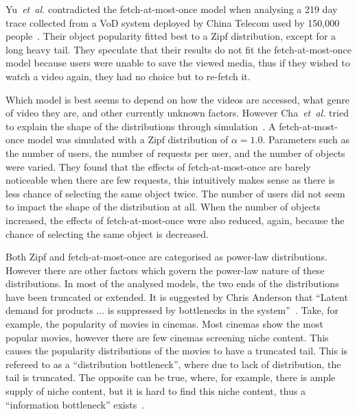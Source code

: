 
    Yu~\emph{et~al.} contradicted the fetch-at-most-once model when analysing a 219 day trace collected from a VoD system deployed by China Telecom used by 150,000 people~\cite{yu2006uub}. Their object popularity fitted best to a Zipf distribution, except for a long heavy tail. They speculate that their results do not fit the fetch-at-most-once model because users were unable to save the viewed media, thus if they wished to watch a video again, they had no choice but to re-fetch it.

    Which model is best seems to depend on how the videos are accessed, what genre of video they are, and other currently unknown factors. However Cha~\emph{et~al.} tried to explain the shape of the distributions through simulation~\cite{cha2007tyt}. A fetch-at-most-once model was simulated with a Zipf distribution of $\alpha=1.0$. Parameters such as the number of users, the number of requests per user, and the number of objects were varied. They found that the effects of fetch-at-most-once are barely noticeable when there are few requests, this intuitively makes sense as there is less chance of selecting the same object twice. The number of users did not seem to impact the shape of the distribution at all. When the number of objects increased, the effects of fetch-at-most-once were also reduced, again, because the chance of selecting the same object is decreased.

    Both Zipf and fetch-at-most-once are categorised as power-law distributions. However there are other factors which govern the power-law nature of these distributions. In most of the analysed models, the two ends of the distributions have been truncated or extended. It is suggested by Chris Anderson that ``Latent demand for products ... is suppressed by bottlenecks in the system''~\cite{anderson2006tlt}. Take, for example, the popularity of movies in cinemas. Most cinemas show the most popular movies, however there are few cinemas screening niche content. This causes the popularity distributions of the movies to have a truncated tail. This is refereed to as a ``distribution bottleneck'', where due to lack of distribution, the tail is truncated. The opposite can be true, where, for example, there is ample supply of niche content, but it is hard to find this niche content, thus a ``information bottleneck'' exists~\cite{cha2007tyt}.



